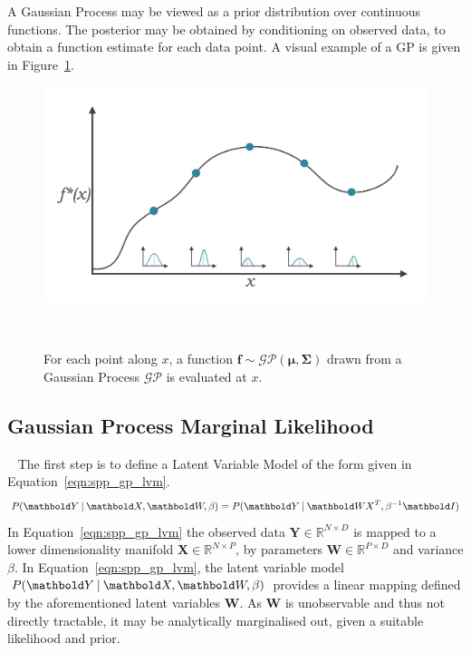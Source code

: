 A Gaussian Process may be viewed as a prior distribution over continuous functions. The posterior 
may be obtained by conditioning on observed data, to obtain a function estimate for each data point.
A visual example of a GP is given in Figure~\ref{figure:gp_func_dist}.
\begin{figure}[!htbp]
  \centering
  \includegraphics[width=\linewidth]{figures/spp/gp.pdf}
  \caption[GP as a Distribution Over Functions]{For each point along \( x \), 
  a function \( \bm{f} \sim \mathcal{GP}(\bm{\mu}, \bm{\Sigma}) \) drawn from a Gaussian Process 
  \( \mathcal{GP} \) is evaluated at \( x \).}
~\label{figure:gp_func_dist}
\end{figure}

\subsection{Gaussian Process Marginal Likelihood}
~\label{subsubsec:spp_gp_marginal_likelihood}
The first step is to define a Latent Variable Model of the form given in Equation~\ref{eqn:spp_gp_lvm}.
\begin{equation}
  \label{eqn:spp_gp_lvm}
  P(\bm{Y} \given \bm{X}, \bm{W}, \beta) = P(\bm{Y} \given \bm{WX}^{T}, \beta^{-1}\bm{I})
\end{equation}
In Equation~\ref{eqn:spp_gp_lvm} the observed data \(\bm{Y} \in \mathbb{R}^{N \times D}\) 
is mapped to a lower dimensionality manifold \(\bm{X} \in \mathbb{R}^{N \times P}\), by parameters 
\(\bm{W} \in \mathbb{R}^{P \times D}\) and variance \( \beta \). In Equation~\ref{eqn:spp_gp_lvm}, 
the latent variable model \( P(\bm{Y} \given \bm{X}, \bm{W}, \beta) \) provides a linear mapping 
defined by the aforementioned latent variables \( \bm{W} \). As \( \bm{W} \) is unobservable and 
thus not directly tractable, it may be analytically marginalised out, given a suitable likelihood 
and prior.

